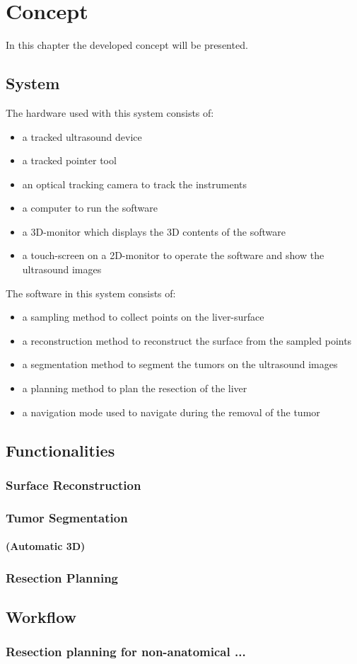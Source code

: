 \chapter{Concept}
In this chapter the developed concept will be presented. 
\section{System}
The hardware used with this system consists of:
\begin{itemize}
  \item a tracked ultrasound device
  \item a tracked pointer tool
  \item an optical tracking camera to track the instruments
  \item a computer to run the software
  \item a 3D-monitor which displays the 3D contents of the software 
  \item a touch-screen on a 2D-monitor to operate the software and show the
    ultrasound images
\end{itemize}
The software in this system consists of:
\begin{itemize}
  \item a sampling method to collect points on the liver-surface
  \item a reconstruction method to reconstruct the surface from the sampled points
  \item a segmentation method to segment the tumors on the ultrasound images
  \item a planning method to plan the resection of the liver
  \item a navigation mode used to navigate during the removal of the tumor
\end{itemize}
\section{Functionalities}
\subsection{Surface Reconstruction}
\subsection{Tumor Segmentation}
\subsubsection{(Automatic 3D)}
\subsection{Resection Planning}
\section{Workflow}
\subsection{Resection planning for non-anatomical ...}

